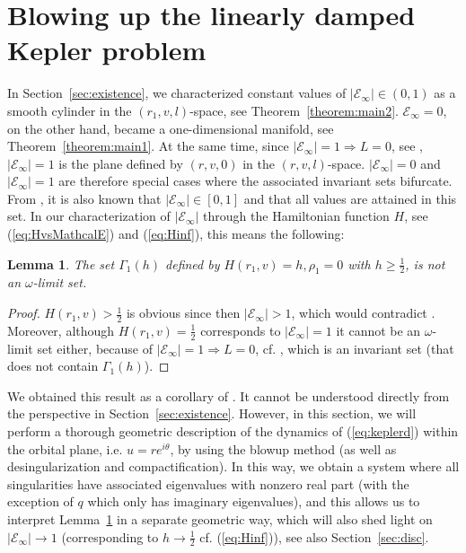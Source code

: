 \documentclass[reqno,12pt]{amsart}
\newcommand{\secref}[1]{Section~\ref{sec:#1}}
\newcommand{\seclab}[1]{\label{sec:#1}}
\renewcommand{\eqref}[1]{(\ref{eq:#1})}
\newcommand{\lemmaref}[1]{Lemma~\ref{lemma:#1}}
\newcommand{\lemmalab}[1]{\label{lemma:#1}}
\newcommand{\thmref}[1]{Theorem~\ref{theorem:#1}}
\newtheorem{lemma}[theorem]{Lemma}
\numberwithin{equation}{section}
\begin{document}
\section{Blowing up the linearly damped Kepler problem}\seclab{blowup}
 In \secref{existence}, we characterized constant values of $\vert \mathcal E_\infty\vert \in (0,1)$ as a smooth cylinder in the $(r_1,v,l)$-space, see \thmref{main2}. $\mathcal E_\infty=0$, on the other hand, became a one-dimensional manifold, see \thmref{main1}. At the same time, since  $\vert \mathcal E_\infty\vert=1\Rightarrow L=0$, see \cite{margheri2017a}, $\vert \mathcal E_\infty\vert=1$ is the plane defined by $(r,v,0)$ in the $(r,v,l)$-space. $\vert \mathcal E_\infty\vert=0$ and $\vert \mathcal E_\infty\vert=1$ are therefore special cases where the associated invariant sets bifurcate. From \cite{margheri2017a,margheri2017ab}, it is also known that $\vert \mathcal E_\infty\vert\in [0,1]$ and that all values are attained in this set. %
% 
In our characterization of $\vert \mathcal E_\infty\vert$ through the Hamiltonian function $H$, see \eqref{HvsMathcalE} and \eqref{Hinf}, this means the following:
\begin{lemma}\lemmalab{Hhge12}
The set $\Gamma_1(h)$ defined by $H(r_1,v)=h,\rho_1=0$ with $h\ge \frac12$, is not an $\omega$-limit set. 
\end{lemma}
\begin{proof}
 $H(r_1,v)>\frac12$ is obvious since then $\vert \mathcal E_\infty\vert>1$, which would contradict \cite{margheri2017a}. Moreover, although $H(r_1,v)=\frac12$ corresponds to $\vert \mathcal E_\infty\vert =1$ it cannot be an $\omega$-limit set either, because of $\vert \mathcal E_\infty\vert =1\Rightarrow L=0$, cf. \cite{margheri2017a}, which is an invariant set (that does not contain $\Gamma_1(h)$). 
\end{proof}
We obtained this result as a corollary of \cite{margheri2017a}. It cannot be understood directly from the perspective in \secref{existence}. However, in this section, we will perform a thorough geometric description of the dynamics of \eqref{keplerd} within the orbital plane, i.e. $u=re^{i\theta}$, by using the blowup method (as well as desingularization and compactification). In this way, we obtain a system where all singularities have associated eigenvalues with nonzero real part (with the exception of $q$ which only has imaginary eigenvalues), and this allows us to interpret \lemmaref{Hhge12} in a separate geometric way, which will also shed light on $\vert \mathcal E_\infty\vert\rightarrow 1$ (corresponding to $h\rightarrow \frac12$ cf. \eqref{Hinf}), see also \secref{disc}. 
\end{document}
